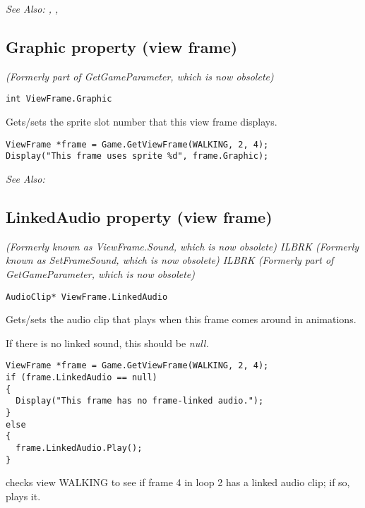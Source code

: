 \it{See Also:} ,
,


\subsection{Graphic property (view frame)}\label{ViewFrame.Graphic}%

\it{(Formerly part of GetGameParameter, which is now obsolete)}

\begin{verbatim}
int ViewFrame.Graphic
\end{verbatim}
Gets/sets the sprite slot number that this view frame displays.

\begin{verbatim}
ViewFrame *frame = Game.GetViewFrame(WALKING, 2, 4);
Display("This frame uses sprite %d", frame.Graphic);
\end{verbatim}

\it{See Also:} 


\subsection{LinkedAudio property (view frame)}\label{ViewFrame.LinkedAudio}%

\it{(Formerly known as ViewFrame.Sound, which is now obsolete)} ILBRK
\it{(Formerly known as SetFrameSound, which is now obsolete)} ILBRK
\it{(Formerly part of GetGameParameter, which is now obsolete)}

\begin{verbatim}
AudioClip* ViewFrame.LinkedAudio
\end{verbatim}
Gets/sets the audio clip that plays when this frame comes around in animations.

If there is no linked sound, this should be \it{null}.

\begin{verbatim}
ViewFrame *frame = Game.GetViewFrame(WALKING, 2, 4);
if (frame.LinkedAudio == null)
{
  Display("This frame has no frame-linked audio.");
}
else
{
  frame.LinkedAudio.Play();
}
\end{verbatim}
checks view WALKING to see if frame 4 in loop 2 has a linked audio clip; if so, plays it.

